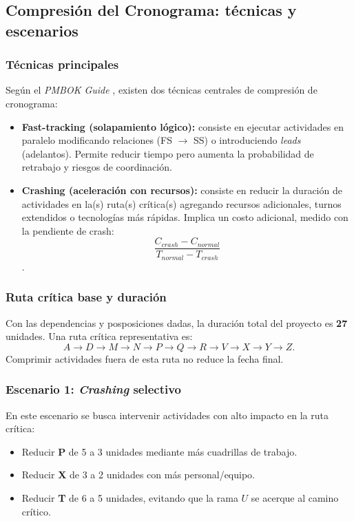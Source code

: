 \subsection{Compresión del Cronograma: técnicas y escenarios}

\subsubsection*{Técnicas principales}

Según el \emph{PMBOK Guide} \cite{PMBOK}, existen dos técnicas centrales de compresión de cronograma:

\begin{itemize}
    \item \textbf{Fast-tracking (solapamiento lógico):} consiste en ejecutar actividades en paralelo modificando relaciones (FS $\rightarrow$ SS) o introduciendo \emph{leads} (adelantos). Permite reducir tiempo pero aumenta la probabilidad de retrabajo y riesgos de coordinación.
    \item \textbf{Crashing (aceleración con recursos):} consiste en reducir la duración de actividades en la(s) ruta(s) crítica(s) agregando recursos adicionales, turnos extendidos o tecnologías más rápidas. Implica un costo adicional, medido con la pendiente de crash: 
    \[
      \frac{C_{crash}-C_{normal}}{T_{normal}-T_{crash}}
    \]
    \cite{Kerzner2017}.
\end{itemize}

\subsubsection*{Ruta crítica base y duración}

Con las dependencias y posposiciones dadas, la duración total del proyecto es \textbf{27} unidades.  
Una ruta crítica representativa es:
\[
A \rightarrow D \rightarrow M \rightarrow N \rightarrow P \rightarrow Q \rightarrow R \rightarrow V \rightarrow X \rightarrow Y \rightarrow Z.
\]
Comprimir actividades fuera de esta ruta no reduce la fecha final.

\subsubsection*{Escenario 1: \emph{Crashing} selectivo}

En este escenario se busca intervenir actividades con alto impacto en la ruta crítica:

\begin{itemize}
    \item Reducir \textbf{P} de 5 a 3 unidades mediante más cuadrillas de trabajo.
    \item Reducir \textbf{X} de 3 a 2 unidades con más personal/equipo.
    \item Reducir \textbf{T} de 6 a 5 unidades, evitando que la rama \(U\) se acerque al camino crítico.
\end{itemize}

